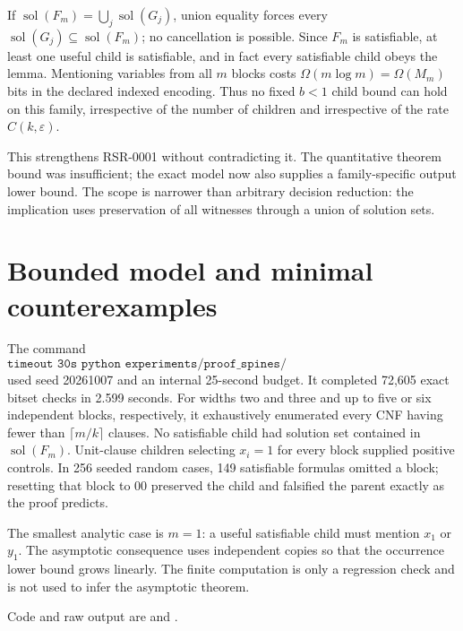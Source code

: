\documentclass[11pt]{article}
\newcommand{\sol}{\operatorname{sol}}
\begin{document}
If $\sol(F_m)=\bigcup_j\sol(G_j)$, union equality forces every
$\sol(G_j)\subseteq\sol(F_m)$; no cancellation is possible.  Since $F_m$ is
satisfiable, at least one useful child is satisfiable, and in fact every
satisfiable child obeys the lemma.  Mentioning variables from all $m$ blocks
costs $\Omega(m\log m)=\Omega(M_m)$ bits in the declared indexed encoding.
Thus no fixed $b<1$ child bound can hold on this family, irrespective of the
number of children and irrespective of the rate $C(k,\varepsilon)$.

This strengthens RSR-0001 without contradicting it.  The quantitative theorem
bound was insufficient; the exact model now also supplies a family-specific
output lower bound.  The scope is narrower than arbitrary decision reduction:
the implication uses preservation of all witnesses through a union of solution
sets.

\section{Bounded model and minimal counterexamples}
The command
\[
\texttt{timeout 30s python experiments/proof\_spines/
sparsification\_solution\_cover\_gate\_test.py}
\]
used seed 20261007 and an internal 25-second budget.  It completed 72,605
exact bitset checks in 2.599 seconds.  For widths two and three and up to five
or six independent blocks, respectively, it exhaustively enumerated every
CNF having fewer than $\lceil m/k\rceil$ clauses.  No satisfiable child had
solution set contained in $\sol(F_m)$.  Unit-clause children selecting $x_i=1$
for every block supplied positive controls.  In 256 seeded random cases, 149
satisfiable formulas omitted a block; resetting that block to $00$ preserved
the child and falsified the parent exactly as the proof predicts.

The smallest analytic case is $m=1$: a useful satisfiable child must mention
$x_1$ or $y_1$.  The asymptotic consequence uses independent copies so that
the occurrence lower bound grows linearly.  The finite computation is only a
regression check and is not used to infer the asymptotic theorem.

Code and raw output are
and
.
\end{document}
